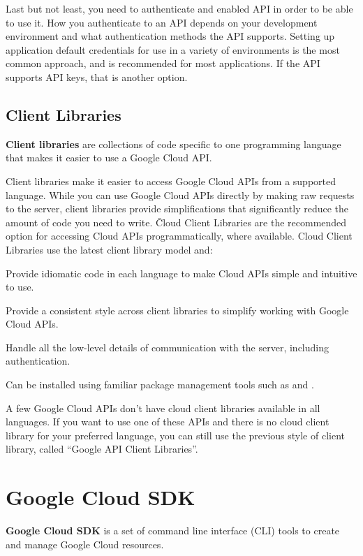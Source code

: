 Last but not least, you need to authenticate and enabled API in order to be able to use it. How you authenticate to
an API depends on your development environment and what authentication methods the API supports. Setting up
application default credentials for use in a variety of environments is the most common approach, and is recommended
for most applications. If the API supports API keys, that is another option.

\subsection{Client Libraries}

\textbf{Client libraries} are collections of code specific to one programming language that makes it easier to use a
Google Cloud API.
\ed

Client libraries make it easier to access Google Cloud APIs from a supported language. While you can use Google Cloud
APIs directly by making raw requests to the server, client libraries provide simplifications that significantly
reduce the amount of code you need to write. \v

Cloud Client Libraries are the recommended option for accessing Cloud APIs programmatically, where available. Cloud
Client Libraries use the latest client library model and:
\bit
\item Provide idiomatic code in each language to make Cloud APIs simple and intuitive to use.
\item Provide a consistent style across client libraries to simplify working with Google Cloud APIs.
\item Handle all the low-level details of communication with the server, including authentication.
\item Can be installed using familiar package management tools such as  and .
\eit

A few Google Cloud APIs don't have cloud client libraries available in all languages. If you want to use one
of these APIs and there is no cloud client library for your preferred language, you can still use the previous style
of client library, called ``Google API Client Libraries''.

\section{Google Cloud SDK}

\textbf{Google Cloud SDK} is a set of command line interface (CLI) tools to create and manage Google Cloud resources.
\ed

